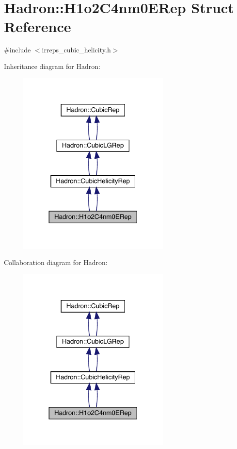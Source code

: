 \hypertarget{structHadron_1_1H1o2C4nm0ERep}{}\section{Hadron\+:\+:H1o2\+C4nm0\+E\+Rep Struct Reference}
\label{structHadron_1_1H1o2C4nm0ERep}


{\ttfamily \#include $<$irreps\+\_\+cubic\+\_\+helicity.\+h$>$}



Inheritance diagram for Hadron\+:\nopagebreak
\begin{figure}[H]
\begin{center}
\leavevmode
\includegraphics[width=216pt]{d0/d02/structHadron_1_1H1o2C4nm0ERep__inherit__graph}
\end{center}
\end{figure}


Collaboration diagram for Hadron\+:\nopagebreak
\begin{figure}[H]
\begin{center}
\leavevmode
\includegraphics[width=216pt]{da/d26/structHadron_1_1H1o2C4nm0ERep__coll__graph}
\end{center}
\end{figure}

